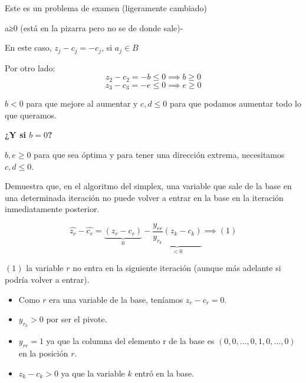 \begin{problem}[7]

Este es un problema de examen (ligeramente cambiado)


\solution

a≥0 (está en la pizarra pero no se de donde sale)-

\spart 

En este caso, $z_j - c_j = -c_j$, si $a_j∈B$

Por otro lado:
\[ z_2 - c_2 = -b ≤ 0 \implies b≥0\]
\[ z_3 - c_3 = -e ≤ 0 \implies e≥0\]

\spart $b<0$ para que mejore al aumentar y $c,d≤0$ para que podamos aumentar todo lo que queramos. 

\textbf{¿Y si $b=0$?}

\spart $b,e≥0$ para que sea óptima y para tener una dirección extrema, necesitamos $c,d≤0$.

\end{problem}

\begin{problem}[8]
Demuestra que, en el algoritmo del simplex, una variable que sale de la base en una determinada
iteración no puede volver a entrar en la base en la iteración inmediatamente posterior.
\solution

\[\hat{z_r} - \hat{c_r} = \underbrace{(z_r - c_r)}_{0} - \underbrace{\frac{y_{rr}}{y_{r_k}} (z_k - c_k)}_{<0}\implies (1)\]

$(1)$  la variable $r$ no entra en la siguiente iteración (aunque más adelante si podría volver a entrar).

\begin{itemize}
\item Como $r$ era una variable de la base, teníamos $z_r - c_r = 0$.
\item $y_{r_k} > 0$ por ser el pivote. 
\item $y_{rr} = 1$ ya que la columna del elemento r de la base es $(0,0,...,0,1,0,...,0)$ en la posición $r$.
\item $z_k - c_k > 0$ ya que la variable $k$ entró en la base. 
\end{itemize}

\end{problem}

